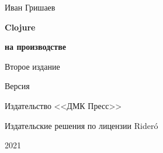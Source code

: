 
\begin{titlepage}

\begin{center}

  {Иван Гришаев}

  \vspace*{5cm}

  {\Huge\textbf{Clojure}}

  \vspace{1mm}

  {\Large\textbf{на производстве}}

  \vspace{7mm}

  {\Large Второе издание}

  {\small Версия \COMMITHASH}

  \vspace*{\fill}

  \ifdmk
  Издательство <<ДМК Пресс>>
  \fi

  \ifridero
  {Издательские решения по лицензии Rider\'{o}}
  \fi

  {2021}

\end{center}

\end{titlepage}

